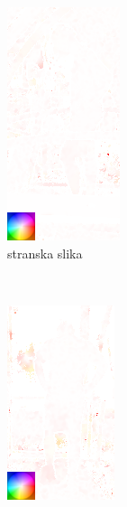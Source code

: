\begin{figure}[!htb]
	\centering
	\begin{subfigure}[t]{0.45\columnwidth}
		\centering
		\includegraphics[width=0.5\columnwidth, frame]{./Slike/stage2-lab-sf-sv-flo-corrected.png}
		\caption{stranska slika}
		\label{fig:stage2-lab-sf-sv-flo}
	\end{subfigure}
	~
	\begin{subfigure}[t]{0.45\columnwidth}
		\centering
		\includegraphics[width=0.5\columnwidth, frame]{./Slike/stage2-lab-sf-bv-flo-corrected.png}

\end{subfigure}
\end{figure}

